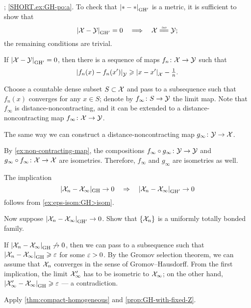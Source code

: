 \parbf{\ref{ex:GH-po}}; \ref{SHORT.ex:GH-po:a}.
To check that $\dist{*}{*}{\GH'}$ is a metric, it is sufficient to show that
\[\dist{\spc{X}}{\spc{Y}}{\GH'}=0 
\quad\Longrightarrow\quad
\spc{X}\iso\spc{Y};\]
the remaining conditions are trivial.

If $\dist{\spc{X}}{\spc{Y}}{\GH'}=0$, then there is a sequence of maps $f_n\colon\mathcal{X}\to \mathcal{Y}$ such that 
\[\dist{f_n(x)}{f_n(x')}{\spc{Y}}\ge \dist{x}{x'}{\spc{X}}-\tfrac1n.\]

Choose a countable dense subset $S\subset \mathcal{X}$ and pass to a subsequence such that $f_n(x)$ converges for any $x\in S$; denote by $f_\infty\:S\z\to \spc{Y}$ the limit map.
Note that $f_\infty$ is distance-noncontracting, and it can be extended to a distance-noncontracting map $f_\infty\colon\mathcal{X}\to \mathcal{Y}$.

The same way we can construct a distance-noncontracting map 
$g_\infty\colon\mathcal{Y}\to \mathcal{X}$.

By \ref{ex:non-contracting-map}, the compositions $f_\infty\circ g_\infty\colon\mathcal{Y}\to \mathcal{Y}$ and $g_\infty\z\circ f_\infty\:\spc{X}\to \spc{X}$ are isometries.
Therefore, $f_\infty$ and $g_\infty$ are isometries as well.

 The implication 
\[|\spc{X}_n-\spc{X}_\infty|_{\GH}\to 0 
\quad\Rightarrow\quad 
\dist{\spc{X}_n}{\spc{X}_\infty}{\GH'}\to 0\]
follows from \ref{ex:eps-isom:GH>isom}. 

Now suppose $\dist{\spc{X}_n}{\spc{X}_\infty}{\GH'}\to 0$.
Show that $\{\mathcal{X}_n\}$ is a uniformly totally bonded family.

If $\dist{\spc{X}_n}{\spc{X}_\infty}{\GH}\not\to 0$, then we can pass to a subsequence such that $\dist{\spc{X}_n}{\spc{X}_\infty}{\GH}\ge\eps$ for some $\varepsilon>0$.
By the Gromov selection theorem, we can assume that $\mathcal{X}_n$ converges in the sense of Gromov--Hausdorff.
From the first implication, the limit $\mathcal{X}_\infty'$ has to be isometric to $\mathcal{X}_\infty$;
on the other hand, $\dist{\spc{X}_\infty'}{\spc{X}_\infty}{\GH}\ge \eps$ --- a contradiction.

Apply \ref{thm:compact-homogeneous} and \ref{prop:GH-with-fixed-Z}.

